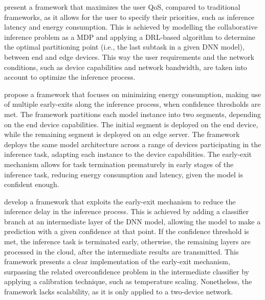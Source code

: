 \begin{description}[style=unboxed, leftmargin=1cm, font=\bfseries]
    \item [\textcite{chen_deep_2024}]
    present a framework that maximizes the user \ac{QoS}, compared to traditional 
    frameworks, as it allows for the user to specify their 
    priorities, such as inference latency and energy consumption. This is achieved 
    by modelling the collaborative inference problem as a \ac{MDP} and applying a
    \ac{DRL}-based algorithm to determine the optimal partitioning point (i.e., the
    last subtask in a given \ac{DNN} model), between end and edge devices. 
    This way the user requirements and the network
    conditions, such as device capabilities and network bandwidth, are taken into 
    account to optimize the inference process.

    \item [\textcite{ma_joint_2025}]
    propose a framework that focuses on minimizing energy consumption, making use
    of multiple early-exits along the inference process, when confidence thresholds 
    are met. The framework partitions each model instance into two segments, depending
    on the end device capabilities. The initial segment is deployed on the end 
    device, while the remaining segment is deployed on an edge server. The framework 
    deploys the same model architecture across a range of devices participating in
    the inference task, adapting each instance to the device capabilities.
    The early-exit mechanism allows for task termination prematurely in 
    early stages of the inference task, reducing energy consumption and
    latency, given the model is confident enough.

    \item [\textcite{r_g_pacheco_calibration-aided_2021}]
    develop a framework that exploits the early-exit mechanism to reduce
    the inference delay in the inference process. This is achieved by adding
    a classifier branch at an intermediate layer of the \ac{DNN} model, allowing
    the model to make a prediction with a given confidence at that point. 
    If the confidence threshold is met, the inference task
    is terminated early, otherwise, the remaining layers are processed in the
    cloud, after the intermediate results are transmitted. This framework
    presents a clear implementation of the early-exit mechanism, surpassing the
    related overconfidence problem in the intermediate classifier by applying
    a calibration technique, such as temperature scaling. Nonetheless, the 
    framework lacks scalability, as it is only applied to a two-device network. 

\end{description}


